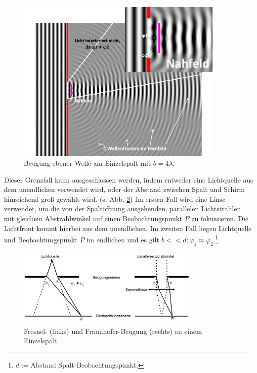 \begin{figure}
    \centering
    \includegraphics[width=0.9\textwidth]{plots/Wave_Diffraction_4Lambda_Slit.png}
    \caption{Beugung ebener Welle am Einzelspalt mit $b = 4\lambda$.\protect\footnotemark}        %
    \label{fig:waveDiff}
\end{figure}

Dieser Grenzfall kann ausgeschlossen werden, indem entweder eine Lichtquelle aus dem unendlichen verwendet wird, oder der Abstand zwischen Spalt und Schirm hinreichend groß gewählt wird. (s. Abb. \ref{fig:fresnelFraunhofer})
Im ersten Fall wird eine Linse verwendet, um die von der Spaltöffnung ausgehenden, parallelen Lichtstrahlen mit gleichem Abstrahlwinkel auf einen Beobachtungspunkt $P$ zu fokussieren. Die Lichtfront kommt hierbei aus dem unendlichen.
Im zweiten Fall liegen Lichtquelle und Beobachtungspunkt $P$ im endlichen und es gilt $b << d : \varphi_1 \approx \varphi_2$.\:\footnote{$d := $Abstand Spalt-Beobachtungspunkt.}

\begin{figure}
    \centering
    \includegraphics[width=0.8\textwidth]{plots/Fresnel_Fraunhofer.png}
    \caption{Fresnel- (links) und Fraunhofer-Beugung (rechts) an einem Einzelspalt.\protect\footnotemark[2]}
    \label{fig:fresnelFraunhofer}
\end{figure}

